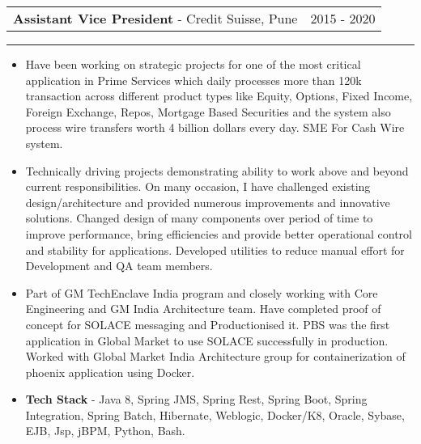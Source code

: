 \documentclass[10pt,A4]{article}
\newcommand{\cvevent}[4]
{

\begin{tabular*}{1\textwidth}{p{13.6cm}  x{3.9cm}}
	\textbf{#2} - \textcolor{bgcol}{#3} &   \vspace{2.0pt}\textcolor{sectcol}{#1}
\end{tabular*}

\vspace{-8pt}
\textcolor{softcol}{\hrule}
\vspace{6pt}

  #4 

}
\begin{document}
\cvevent{2015 - 2020}
{Assistant Vice President}
{Credit Suisse, Pune}
{
\begin{itemize}

\item Have been working on strategic projects for one of the most critical application in Prime
Services which daily processes more than 120k transaction across different product types
like Equity, Options, Fixed Income, Foreign Exchange, Repos, Mortgage Based Securities 
and the system also process wire transfers worth 4 billion dollars every day. SME For Cash Wire system.	

\item Technically driving projects demonstrating ability to work above and beyond current
responsibilities. On many occasion, I have challenged existing design/architecture and provided
numerous improvements and innovative solutions. Changed design of many components
over period of time to improve performance, bring efficiencies and provide better operational
control and stability for applications. Developed utilities to reduce manual effort for
Development and QA team members.

\item Part of GM TechEnclave India program and closely working with Core Engineering and GM
India Architecture team. Have completed proof of concept for SOLACE messaging and Productionised it. 
PBS was the first application in Global Market to use SOLACE successfully in production. 
Worked with Global Market India Architecture group for containerization of phoenix application using
Docker.

\item \textbf{Tech Stack} - Java 8, Spring JMS, Spring Rest, Spring Boot, Spring Integration, Spring Batch, Hibernate, Weblogic, Docker/K8, Oracle, Sybase, EJB, Jsp, jBPM, Python, Bash.

\end{itemize}

}

\ \\ \\
\end{document}
